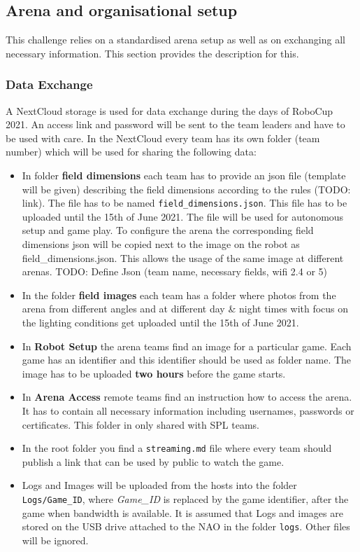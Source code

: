 \subsection{Arena and organisational setup}
This challenge relies on a standardised arena setup as well as on exchanging all necessary information. This section provides the description for this.

\subsubsection{Data Exchange}
A NextCloud storage is used for data exchange during the days of RoboCup 2021. An access link and password will be sent to the team leaders and have to be used with care. In the NextCloud every team has its own folder (team number) which will be used for sharing the following data:

\begin{itemize}
    \item In folder \textbf{field dimensions} each team has to provide an json file (template will be given) describing the field dimensions according to the rules (TODO: link). The file has to be named \texttt{field\_dimensions.json}. This file has to be uploaded until the 15th of June 2021. The file will be used for autonomous setup and game play. To configure the arena the corresponding field dimensions json will be copied next to the image on the robot as field\_dimensions.json. This allows the usage of the same image at different arenas.
    TODO: Define Json (team name, necessary fields, wifi 2.4 or 5)
    \item  In the folder \textbf{field images} each team has a folder where photos from the arena from different angles and at different day \& night times with focus on the lighting conditions get uploaded until the 15th of June 2021.
    \item In \textbf{Robot Setup} the arena teams find an image for a particular game. Each game has an identifier and this identifier should be used as folder name. The image has to be uploaded \textbf{two hours} before the game starts.
    \item In \textbf{Arena Access} remote teams find an instruction how to access the arena. It has to contain all necessary information including usernames,  passwords or certificates. This folder in only shared with SPL teams.
    \item In the root folder you find a \texttt{streaming.md} file where every team should publish a link that can be used by public to watch the game.
    \item Logs and Images will be uploaded from the hosts into the folder \texttt{Logs/Game\_ID}, where \textit{Game\_ID} is replaced by the game identifier, after the game when bandwidth is available. It is assumed that Logs and images are stored on the USB drive attached to the NAO in the folder \texttt{logs}. Other files will be ignored.
\end{itemize}

